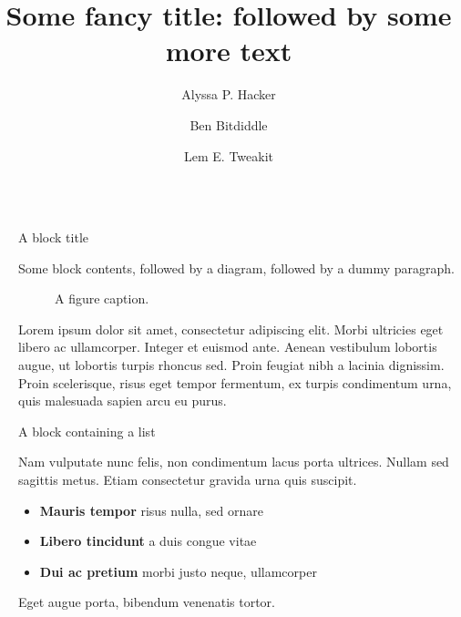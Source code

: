 \documentclass[final]{beamer}
\title{Some fancy title: followed by some more text}
\author{Alyssa P. Hacker \inst{1} \and Ben Bitdiddle \inst{2} \and Lem E. Tweakit \inst{2}}
\institute[shortinst]{\inst{1} Some Institute \samelineand \inst{2} Another Institute}
\newlength{\sepwidth}
\newlength{\colwidth}
\newcommand{\separatorcolumn}{\begin{column}{\sepwidth}\end{column}}
\begin{document}
\begin{frame}[t]
  \begin{columns}[t]
    \separatorcolumn
    
    \begin{column}{\colwidth}
      
      \begin{block}{A block title}
        
        Some block contents, followed by a diagram, followed by a dummy paragraph.
        
        \begin{figure}
          \centering
          \caption{A figure caption.}
        \end{figure}
        
        Lorem ipsum dolor sit amet, consectetur adipiscing elit. Morbi ultricies
        eget libero ac ullamcorper. Integer et euismod ante. Aenean vestibulum
        lobortis augue, ut lobortis turpis rhoncus sed. Proin feugiat nibh a
        lacinia dignissim. Proin scelerisque, risus eget tempor fermentum, ex
        turpis condimentum urna, quis malesuada sapien arcu eu purus.
        
      \end{block}
      
      \begin{block}{A block containing a list}
        
        Nam vulputate nunc felis, non condimentum lacus porta ultrices. Nullam sed
        sagittis metus. Etiam consectetur gravida urna quis suscipit.
        
        \begin{itemize}
          \item \textbf{Mauris tempor} risus nulla, sed ornare
          \item \textbf{Libero tincidunt} a duis congue vitae
          \item \textbf{Dui ac pretium} morbi justo neque, ullamcorper
        \end{itemize}
        
        Eget augue porta, bibendum venenatis tortor.
        
      \end{block}
      

\end{column}
\end{columns}
\end{frame}
\end{document}
